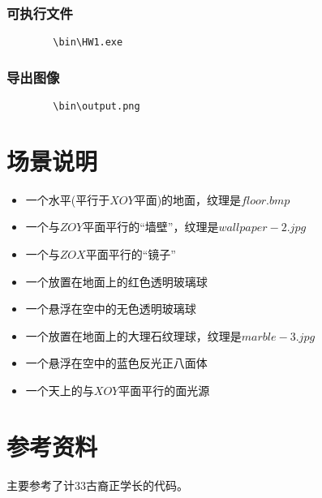﻿\documentclass{article}
\begin{document}
        \subsubsection*{\color{black}可执行文件}
        \noindent
        \begin{lstlisting}
        \bin\HW1.exe
        \end{lstlisting}
        \subsubsection*{\color{black}导出图像}
        \noindent
        \begin{lstlisting}
        \bin\output.png
        \end{lstlisting}
  \newpage
  \section*{\color{blue}场景说明}
  \begin{itemize}
    \item 一个水平(平行于$XOY$平面)的地面，纹理是$floor.bmp$
    \item 一个与$ZOY$平面平行的“墙壁”，纹理是$wallpaper-2.jpg$
    \item 一个与$ZOX$平面平行的“镜子”
    \item 一个放置在地面上的红色透明玻璃球
    \item 一个悬浮在空中的无色透明玻璃球
    \item 一个放置在地面上的大理石纹理球，纹理是$marble-3.jpg$
    \item 一个悬浮在空中的蓝色反光正八面体
    \item 一个天上的与$XOY$平面平行的面光源
  \end{itemize}
  \section*{\color{blue}参考资料}
  主要参考了计33古裔正学长的代码。 
\end{document}
